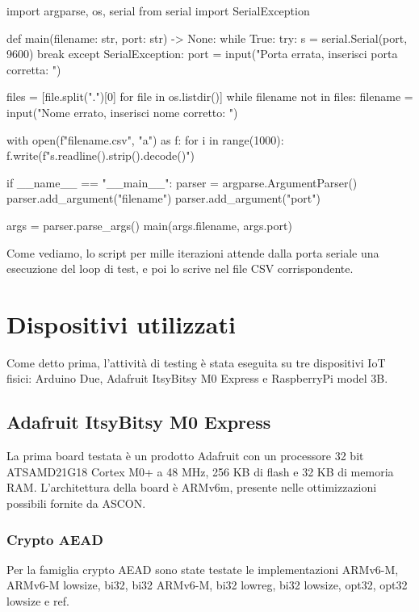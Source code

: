 \documentclass[12pt,a4paper,italian]{report}
\begin{document}
\begin{python}
import argparse, os, serial
from serial import SerialException


def main(filename: str, port: str) -> None:
    while True:
        try:
            s = serial.Serial(port, 9600)
            break
        except SerialException:
            port = input("Porta errata, inserisci porta corretta: ")

    files = [file.split(".")[0] for file in os.listdir()]
    while filename not in files:
        filename = input("Nome errato, inserisci nome corretto: ")

    with open(f"{filename}.csv", "a") as f:
        for i in range(1000):
            f.write(f"{s.readline().strip().decode()}\n")


if __name__ == "__main__":
    parser = argparse.ArgumentParser()
    parser.add_argument("filename")
    parser.add_argument("port")
    
    args = parser.parse_args()
    main(args.filename, args.port)
\end{python}

\noindent Come vediamo, lo script per mille iterazioni attende dalla porta seriale una esecuzione del loop di test, e poi lo scrive nel file CSV corrispondente.

\section{Dispositivi utilizzati}

Come detto prima, l'attività di testing è stata eseguita su tre dispositivi IoT fisici: Arduino Due, Adafruit ItsyBitsy M0 Express e RaspberryPi model 3B.

\subsection{Adafruit ItsyBitsy M0 Express}

La prima board testata è un prodotto Adafruit con un processore 32 bit ATSAMD21G18 Cortex M0+ a 48 MHz, 256 KB di flash e 32 KB di memoria RAM.\cite{adafruit} L'architettura della board è ARMv6m, presente nelle ottimizzazioni possibili fornite da ASCON.\cite{arm}

\subsubsection{Crypto AEAD}

Per la famiglia crypto AEAD sono state testate le implementazioni ARMv6-M, ARMv6-M lowsize, bi32, bi32 ARMv6-M, bi32 lowreg, bi32 lowsize, opt32, opt32 lowsize e ref.
\end{document}
